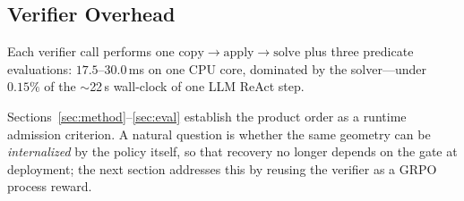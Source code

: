 \subsection{Verifier Overhead}
\label{sec:eval:cost}

Each verifier call performs one $\mathrm{copy}\to\mathrm{apply}\to\mathrm{solve}$ plus three predicate evaluations: $17.5$--$30.0$\,ms on one CPU core, dominated by the solver---under $0.15\%$ of the $\sim$22\,s wall-clock of one LLM ReAct step.

Sections~\ref{sec:method}--\ref{sec:eval} establish the product order as a runtime admission criterion. A natural question is whether the same geometry can be \emph{internalized} by the policy itself, so that recovery no longer depends on the gate at deployment; the next section addresses this by reusing the verifier as a GRPO process reward.
